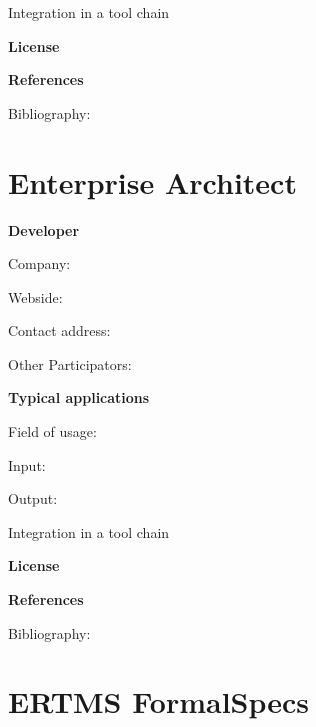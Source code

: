 \documentclass{./template/openetcs2}
\begin{document}
	Integration in a tool chain



	\textbf{License}


	\textbf{References}

	Bibliography:


\section{Enterprise Architect}

	\textbf{Developer}

	Company: 

	Webside:

	Contact address:

	Other  Participators:



	\textbf{Typical applications}

	Field of usage:


	Input:

	Output:





	Integration in a tool chain



	\textbf{License}


	\textbf{References}

	Bibliography:


\section{ERTMS FormalSpecs}
\end{document}
